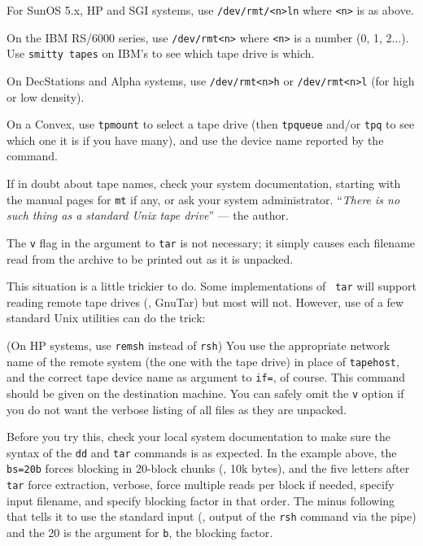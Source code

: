 \item\bul For SunOS 5.x, HP and SGI systems, use {\tt /dev/rmt/<n>ln}
                 where {\tt <n>} is as above.
\item\bul On the IBM RS/6000 series, use
                 {\tt /dev/rmt<n>} where {\tt <n>} is a number (0, 1,
                 2$\dots$).  Use {\tt smitty tapes} on IBM's to see which
                 tape drive is which.
\item\bul On DecStations and Alpha systems, use
                 {\tt /dev/rmt<n>h} or {\tt /dev/rmt<n>l} (for high
                 or low density).
\item\bul On a Convex, use {\tt tpmount} to select a
                 tape drive (then {\tt tpqueue} and/or {\tt tpq} to see
                 which one it is if you have many), and use the device
                 name reported by the command.
\medskip

\noindent If in doubt about tape names, check your system documentation,
starting with the manual pages for {\tt mt} if any, or ask your system
administrator.  ``{\it There is no such thing as a standard Unix tape
drive\/}'' --- the author.

The {\tt v} flag in the argument to {\tt tar} is not necessary; it
simply causes each filename read from the archive to be printed out as it
is unpacked.

\medskip{}

This situation is a little trickier to do.  Some implementations of {\tt
tar} will support reading remote tape drives (\eg, GnuTar) but most will
not.  However, use of a few standard Unix utilities can do the trick:
\medskip

\medskip

\noindent (On HP systems, use {\tt remsh} instead of {\tt rsh})  You use
the appropriate network name of the remote system (the one with the tape
drive) in place of {\tt tapehost}, and the correct tape device name as
argument to {\tt if=}, of course.  This command should be given on the
destination machine.  You can safely omit the {\tt v} option if you do not
want the verbose listing of all files as they are unpacked.

Before you try this, check your local system documentation to make sure
the syntax of the {\tt dd} and {\tt tar} commands is as expected.  In the
example above, the {\tt bs=20b} forces blocking in 20-block chunks (\ie,
10k bytes), and the five letters after {\tt tar} force extraction,
verbose, force multiple reads per block if needed, specify input filename,
and specify blocking factor in that order.  The minus following that tells
it to use the standard input (\ie, output of the {\tt rsh} command via the
pipe) and the 20 is the argument for {\tt b}, the blocking factor.

